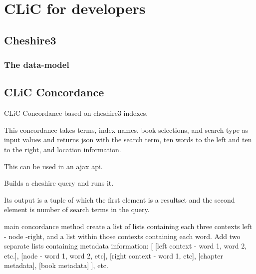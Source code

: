 \documentclass[letterpaper,10pt,english]{sphinxmanual}
\begin{document}
\chapter{CLiC for developers}
\label{apidoc::doc}\label{apidoc:clic-for-developers}

\section{Cheshire3}
\label{apidoc:cheshire3}

\subsection{The data-model}
\label{apidoc:the-data-model}

\section{CLiC Concordance}
\label{apidoc:clic-concordance}\label{apidoc:module-concordance}
CLiC Concordance based on cheshire3 indexes.

\begin{fulllineitems}
\label{apidoc:concordance.Concordance}
This concordance takes terms, index names, book selections, and search type
as input values and returns json with the search term, ten words to the left and
ten to the right, and location information.

This can be used in an ajax api.

\begin{fulllineitems}
\label{apidoc:concordance.Concordance.build_and_run_query}
Builds a cheshire query and runs it.

Its output is a tuple of which the first element is a resultset and
the second element is number of search terms in the query.

\end{fulllineitems}


\begin{fulllineitems}
\label{apidoc:concordance.Concordance.create_concordance}
main concordance method
create a list of lists containing each three contexts left - node -right,
and a list within those contexts containing each word.
Add two separate lists containing metadata information:
{[}
{[}left context - word 1, word 2, etc.{]},
{[}node - word 1, word 2, etc{]},
{[}right context - word 1, etc{]},
{[}chapter metadata{]},
{[}book metadata{]}
{]},
etc.

\end{fulllineitems}


\end{fulllineitems}
\end{document}
